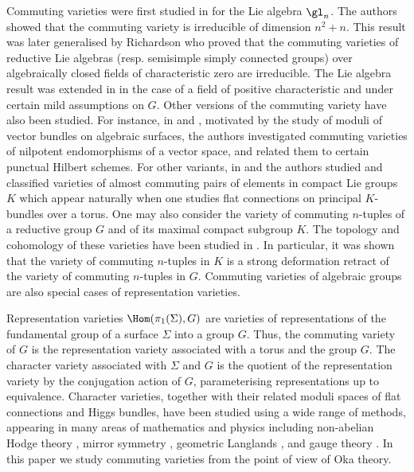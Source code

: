 \documentclass[12pt, a4paper, oneside]{amsart}
\theoremstyle{plain} %
\theoremstyle{definition} %
\theoremstyle{remark} %
\begin{document}
Commuting varieties were first studied in \cite{MT55} for the Lie algebra $\gl_n$. The authors showed that the commuting variety is irreducible of dimension $n^2+n$. This result was later generalised by Richardson \cite{Ric79} who proved that the commuting varieties of reductive Lie algebras (resp. semisimple simply connected groups) over algebraically closed fields of characteristic zero are irreducible. The Lie algebra result was extended in \cite{Lev02} in the case of a field of positive characteristic and under certain mild assumptions on $G$. Other versions of the commuting variety have also been studied. For instance, in \cite{Bar01} and \cite{Pre03}, motivated by the study of moduli of vector bundles on algebraic surfaces, the authors investigated commuting varieties of nilpotent endomorphisms of a vector space, and related them to certain punctual Hilbert schemes. For other variants, in \cite{BFM02} and \cite{KS00} the authors studied and classified varieties of almost commuting pairs of elements in compact Lie groups $K$ which appear naturally when one studies flat connections on principal $K$-bundles over a torus. One may also consider the variety of commuting $n$-tuples of a reductive group $G$ and of its maximal compact subgroup $K$. The topology and cohomology of these varieties have been studied in \cite{Bai07,GPS12,PS13}. In particular, it was shown that the variety of commuting $n$-tuples in $K$ is a strong deformation retract of the variety of commuting $n$-tuples in $G$. Commuting varieties of algebraic groups are also special cases of representation varieties.

\medskip

Representation varieties $\Hom(\pi_1(\Sigma),G)$ are varieties of representations of the fundamental group of a surface $\Sigma$ into a group $G$. Thus, the commuting variety of $G$ is the representation variety associated with a torus and the group $G$. The character variety associated with $\Sigma$ and $G$ is the quotient of the representation variety by the conjugation action of $G$, parameterising representations up to equivalence. Character varieties, together with their related moduli spaces of flat connections and Higgs bundles, have been studied using a wide range of methods, appearing in many areas of mathematics and physics including non-abelian Hodge theory \cite{Sim92,Sim94}, mirror symmetry \cite{HT03}, geometric Langlands \cite{BD96, BZN18}, and gauge theory \cite{AB83,Hit87}. In this paper we study commuting varieties from the point of view of Oka theory.
\medskip
\end{document}
